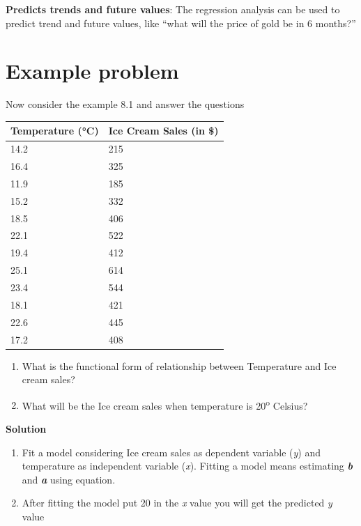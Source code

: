 \documentclass[
]{book}
\begin{document}
\textbf{Predicts trends and future values}: The regression analysis can be
used to predict trend and future values, like ``what will the price of
gold be in 6 months?''

\hypertarget{example-problem}{%
\section{Example problem}\label{example-problem}}

Now consider the example 8.1 and answer the questions

\begin{longtable}[]{@{}ll@{}}
\toprule
Temperature (°C) & Ice Cream Sales (in \$) \\
\midrule
\endhead
14.2 & 215 \\
16.4 & 325 \\
11.9 & 185 \\
15.2 & 332 \\
18.5 & 406 \\
22.1 & 522 \\
19.4 & 412 \\
25.1 & 614 \\
23.4 & 544 \\
18.1 & 421 \\
22.6 & 445 \\
17.2 & 408 \\
\bottomrule
\end{longtable}

\begin{enumerate}
\def\labelenumi{\arabic{enumi}.}
\item
  What is the functional form of relationship between Temperature and
  Ice cream sales?
\item
  What will be the Ice cream sales when temperature is 20\textsuperscript{o} Celsius?
\end{enumerate}

\textbf{Solution}

\begin{enumerate}
\def\labelenumi{\arabic{enumi}.}
\item
  Fit a model considering Ice cream sales as dependent variable (\emph{y})
  and temperature as independent variable (\emph{x}). Fitting a model means
  estimating \textbf{\emph{b}} and \textbf{\emph{a}} using equation.
\item
  After fitting the model put 20 in the \emph{x} value you will get the
  predicted \emph{y} value
\end{enumerate}
\end{document}
